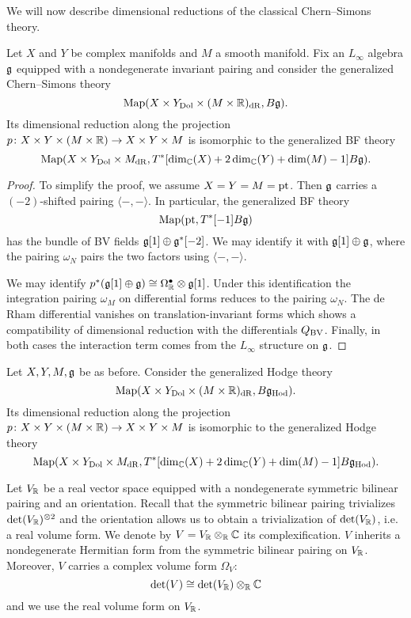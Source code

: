 \documentclass[10pt, oneside]{article}
\newcommand{\Hod}{\mathrm{Hod}}
\begin{document}
We will now describe dimensional reductions of the classical Chern--Simons theory.

\begin{prop} \label{CS_to_BF_diml_red_prop}
Let $X$ and $Y$ be complex manifolds and $M$ a smooth manifold. Fix an $L_\infty$ algebra $\mathfrak g$ equipped with a nondegenerate invariant pairing and consider the generalized Chern--Simons theory
\[\operatorname{Map}(X\times Y_{\mathrm{Dol}}\times (M\times \mathbb R)_{\mathrm{dR}}, B\mathfrak g).\]
Its dimensional reduction along the projection $p\colon X\times Y\times (M\times \mathbb R)\rightarrow X\times Y\times M$ is isomorphic to the generalized BF theory
\[\operatorname{Map}(X\times Y_{\mathrm{Dol}}\times M_{\mathrm{dR}}, T^*[\dim_\mathbb C(X) + 2\dim_\mathbb C(Y) + \dim(M) - 1] B\mathfrak g).\]
\end{prop}

\begin{proof}
To simplify the proof, we assume $X=Y=M=\operatorname{pt}$. Then $\mathfrak g$ carries a $(-2)$-shifted pairing $\langle-,-\rangle$. In particular, the generalized BF theory
\[\operatorname{Map}(\operatorname{pt}, T^*[-1] B \mathfrak g)\]
has the bundle of BV fields $\mathfrak g[1] \oplus \mathfrak g^*[-2]$. We may identify it with $\mathfrak g[1]\oplus \mathfrak g$, where the pairing $\omega_N$ pairs the two factors using $\langle-,-\rangle$.

We may identify $p^*(\mathfrak g[1]\oplus \mathfrak g)\cong \Omega^\bullet_{\mathbb R}\otimes \mathfrak g[1]$. Under this identification the integration pairing $\omega_M$ on differential forms reduces to the pairing $\omega_N$. The de Rham differential vanishes on translation-invariant forms which shows a compatibility of dimensional reduction with the differentials $Q_{\mathrm{BV}}$. Finally, in both cases the interaction term comes from the $L_\infty$ structure on $\mathfrak g$.
\end{proof}

\begin{corollary}
Let $X, Y, M, \mathfrak g$ be as before. Consider the generalized Hodge theory
\[\map(X\times Y_{\mr{Dol}}\times (M\times\RR)_{\mr{dR}}, B\fg_\Hod).\]
Its dimensional reduction along the projection $p\colon X\times Y\times (M\times \mathbb R)\rightarrow X\times Y\times M$ is isomorphic to the generalized Hodge theory
\[\map(X\times Y_{\mr{Dol}}\times M_{\mr{dR}}, T^*[\dim_\CC(X) + 2\dim_\CC(Y) + \dim(M) - 1] B\fg_\Hod).\]
\label{cor:Hodgetopologicalreduction}
\end{corollary}

Let $V_\mathbb R$ be a real vector space equipped with a nondegenerate symmetric bilinear pairing and an orientation. Recall that the symmetric bilinear pairing trivializes $\det(V_\mathbb R)^{\otimes 2}$ and the orientation allows us to obtain a trivialization of $\det(V_\mathbb R)$, i.e. a real volume form. We denote by $V=V_\mathbb R\otimes_{\mathbb R}\mathbb C$ its complexification. $V$ inherits a nondegenerate Hermitian form from the symmetric bilinear pairing on $V_\mathbb R$. Moreover, $V$ carries a complex volume form $\Omega_V$:
\[\det(V)\cong \det(V_\mathbb R)\otimes_{\mathbb R}\mathbb C\]
and we use the real volume form on $V_\mathbb R$.
\end{document}
